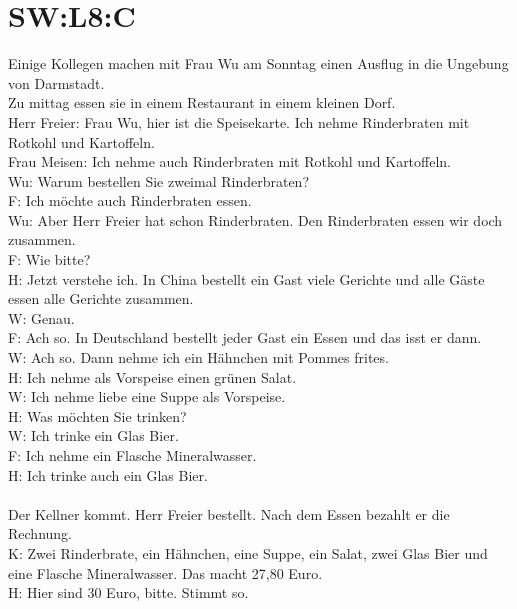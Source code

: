 \section{SW:L8:C}
\noindent
Einige Kollegen machen mit Frau Wu am Sonntag einen Ausflug in die Ungebung von Darmstadt.  \\
Zu mittag essen sie in einem Restaurant in einem kleinen Dorf.  \\
Herr Freier: Frau Wu, hier ist die Speisekarte.  Ich nehme Rinderbraten mit Rotkohl und Kartoffeln. \\
Frau Meisen: Ich nehme auch Rinderbraten mit Rotkohl und Kartoffeln. \\
Wu: Warum bestellen Sie zweimal Rinderbraten? \\
F: Ich möchte auch Rinderbraten essen. \\
Wu: Aber Herr Freier hat schon Rinderbraten. Den Rinderbraten essen wir doch zusammen. \\
F: Wie bitte? \\
H: Jetzt verstehe ich. In China bestellt ein Gast viele Gerichte und alle Gäste essen alle Gerichte zusammen. \\
W: Genau. \\
F: Ach so. In Deutschland bestellt jeder Gast ein Essen und das isst er dann. \\
W: Ach so. Dann nehme ich ein Hähnchen mit Pommes frites.  \\
H: Ich nehme als Vorspeise einen grünen Salat.  \\
W: Ich nehme liebe eine Suppe als Vorspeise.  \\
H: Was möchten Sie trinken? \\
W: Ich trinke ein Glas Bier. \\
F: Ich nehme ein Flasche Mineralwasser. \\
H: Ich trinke auch ein Glas Bier. \\
\\
\noindent
Der Kellner kommt. Herr Freier bestellt. Nach dem Essen bezahlt er die Rechnung. \\
K: Zwei Rinderbrate, ein Hähnchen, eine Suppe, ein Salat, zwei Glas Bier und eine Flasche Mineralwasser. Das macht 27,80 Euro. \\
H: Hier sind 30 Euro, bitte. Stimmt so. \\

